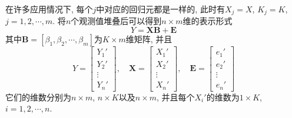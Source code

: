 \documentclass[cn, 12pt, math=mtpro2, bibstyle=apa, blue, twocol]{elegantbook}
\begin{document}
在许多应用情况下, 每个$j$中对应的回归元都是一样的, 此时有$X_j=X$, $K_j=K$, $j=1,2,\cdots,m$. 将$n$个观测值堆叠后可以得到$n\times m$维的表示形式
$$Y=\mathbold{XB}+\mathbold{E}$$
其中$\mathbold{B}=[\beta_1,\beta_2,\cdots,\beta_m]$为$K\times m$维矩阵, 并且
\begin{equation}\label{eq5.6}
Y=\begin{bmatrix}
      Y_1' \\
      Y_2' \\
      \vdots \\
      Y_n'
    \end{bmatrix},\quad \mathbold{X}=\begin{bmatrix}
                                       X_1' \\
                                       X_2' \\
                                       \vdots \\
                                       X_n'
                                     \end{bmatrix}, \quad \mathbold{E}=\begin{bmatrix}
                                                                                      e_1' \\
                                                                                      e_2' \\
                                                                                      \vdots \\
                                                                                      e_n'
                                                                                    \end{bmatrix}
\end{equation}
它们的维数分别为$n\times m$, $n\times K$以及$n\times m$, 并且每个$X_i'$的维数为$1\times K$, $i=1,2,\cdots,n$.
\end{document}
